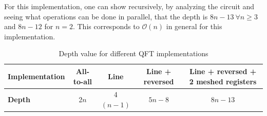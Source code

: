 For this implementation, one can show recursively, by analyzing the circuit and seeing what operations can be done in parallel, that the depth is $8n-13 \ \forall n \geq 3$ and $8n-12$ for $n=2$. This corresponds to $\mathcal{O}(n)$ in general for this implementation.

\begin{table}[h]
\centering
\begin{tabular}{l|cccc}
 \textbf{Implementation}& \textbf{All-to-all} & \textbf{Line} & \textbf{Line + reversed} & \textbf{Line + reversed + 2 meshed registers} \\
\hline
\textbf{Depth}           & 2$n$                & 4$(n-1)$                & $5n-8$                 & $8n-13$               
\end{tabular}
\caption{Depth value for different QFT implementations}
\label{tab:depth_methods}
\end{table}





